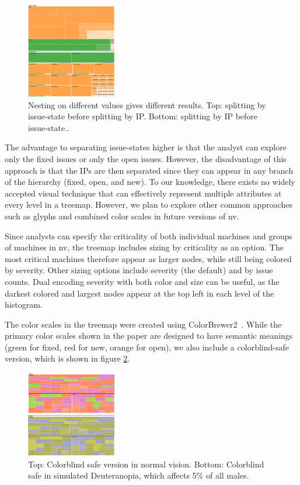\documentclass{acm_proc_article-sp}
\begin{document}
\begin{figure}
  \centering
  \includegraphics[width=0.35\textwidth]{../screenshots/state_issue}
  \caption{Nesting on different values gives different results. Top: splitting by issue-state before splitting by IP. Bottom: splitting by IP before issue-state..}
\label{state-issue}
\end{figure}

The advantage to separating issue-states higher is that the analyst can explore only the fixed issues or only the open issues.
However, the disadvantage of this approach is that the IPs are then separated since they can appear in any branch of the hierarchy (fixed, open, and new).
To our knowledge, there exists no widely accepted visual technique that can effectively represent multiple attributes at every level in a treemap.
However, we plan to explore other common approaches such as glyphs and combined color scales in future versions of nv.


Since analysts can specify the criticality of both individual machines and groups of machines in nv, the treemap includes sizing by criticality as an option.
The most critical machines therefore appear as larger nodes, while still being colored by severity.
Other sizing options include severity (the default) and by issue counts.
Dual encoding severity with both color and size can be useful, as the darkest colored and largest nodes appear at the top left in each level of the histogram.

The color scales in the treemap were created using ColorBrewer2~\cite{colorbrewer2}.
While the primary color scales shown in the paper are designed to have semantic meanings (green for fixed, red for new, orange for open), we also include a colorblind-safe version, which is shown in figure \ref{cb-mode}.


\begin{figure}
  \centering
  \includegraphics[width=0.35\textwidth]{../screenshots/cb_version_both}
  \caption{Top: Colorblind safe version in normal vision. Bottom: Colorblind safe in simulated Deuteranopia, which affects 5\% of all males.}
\label{cb-mode}
\end{figure}
\end{document}
